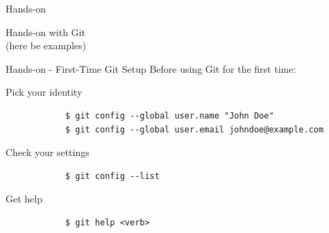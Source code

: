 \documentclass{beamer}
\begin{document}
\begin{frame}{Hands-on}
	\begin{center}
		Hands-on with Git \\ (here be examples)
	\end{center}
\end{frame}

\begin{frame}[fragile]{Hands-on - First-Time Git Setup}
	Before using Git for the first time:
	\begin{exampleblock}{Pick your identity}
		\begin{verbatim}
			$ git config --global user.name "John Doe"
			$ git config --global user.email johndoe@example.com
		\end{verbatim}
	\end{exampleblock}
	
	\begin{exampleblock}{Check your settings}
		\begin{verbatim}
			$ git config --list
		\end{verbatim}
	\end{exampleblock}
	
	\begin{exampleblock}{Get help}
		\begin{verbatim}
			$ git help <verb>
		\end{verbatim}
	\end{exampleblock}
\end{frame}
\end{document}
